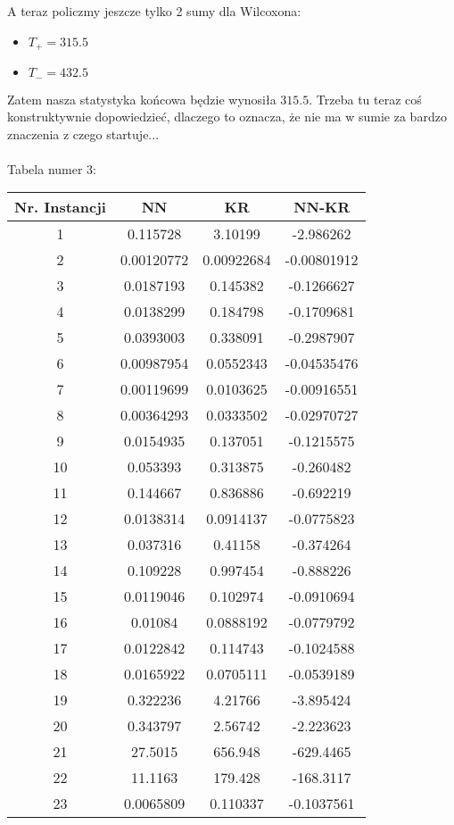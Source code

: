 \documentclass{article}
\begin{document}
A teraz policzmy jeszcze tylko 2 sumy dla Wilcoxona:
\begin{itemize}
	\item $T_+ = 315.5$
	\item $T_- = 432.5$
\end{itemize}
Zatem nasza statystyka końcowa będzie wynosiła $315.5$. Trzeba tu teraz coś konstruktywnie dopowiedzieć, dlaczego to oznacza, że nie ma w sumie za bardzo znaczenia z czego startuje...\\
\\
Tabela numer 3:
\begin{table}[h!]
\centering
\begin{tabular}{c||c|c||c}
Nr. Instancji & NN & KR & NN-KR \\
\hline
1 & 0.115728 & 3.10199 & -2.986262 \\
2 & 0.00120772 & 0.00922684 & -0.00801912 \\
3 & 0.0187193 & 0.145382 & -0.1266627 \\
4 & 0.0138299 & 0.184798 & -0.1709681 \\
5 & 0.0393003 & 0.338091 & -0.2987907 \\
6 & 0.00987954 & 0.0552343 & -0.04535476 \\
7 & 0.00119699 & 0.0103625 & -0.00916551 \\
8 & 0.00364293 & 0.0333502 & -0.02970727 \\
9 & 0.0154935 & 0.137051 & -0.1215575 \\
10 & 0.053393 & 0.313875 & -0.260482 \\
11 & 0.144667 & 0.836886 & -0.692219 \\
12 & 0.0138314 & 0.0914137 & -0.0775823 \\
13 & 0.037316 & 0.41158 & -0.374264 \\
14 & 0.109228 & 0.997454 & -0.888226 \\
15 & 0.0119046 & 0.102974 & -0.0910694 \\
16 & 0.01084 & 0.0888192 & -0.0779792 \\
17 & 0.0122842 & 0.114743 & -0.1024588 \\
18 & 0.0165922 & 0.0705111 & -0.0539189 \\
19 & 0.322236 & 4.21766 & -3.895424 \\
20 & 0.343797 & 2.56742 & -2.223623 \\
21 & 27.5015 & 656.948 & -629.4465 \\
22 & 11.1163 & 179.428 & -168.3117 \\
23 & 0.0065809 & 0.110337 & -0.1037561 \\

\end{tabular}
\end{table}
\end{document}
